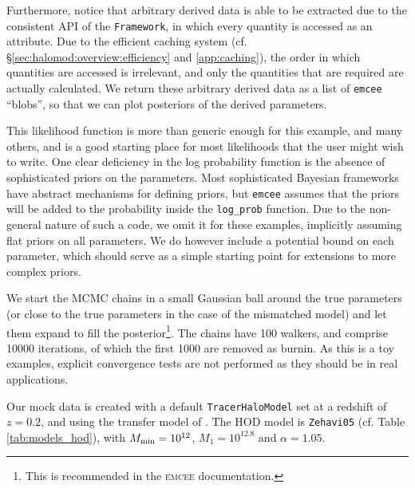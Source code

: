 \documentclass[5p,aas_macros]{elsarticle}
\newcommand{\framework}{\texttt{Framework}}
\begin{document}
Furthermore, notice that arbitrary derived data is able to be extracted due to the consistent API of the \framework, in which every quantity is accessed as an attribute. 
Due to the efficient caching system (cf. \S\ref{sec:halomod:overview:efficiency} and \ref{app:caching}), the order in which quantities are accessed is irrelevant, and only the quantities that are required are actually calculated.
We return these arbitrary derived data as a list of \verb|emcee| ``blobs'', so that we can plot posteriors of the derived parameters.

This likelihood function is more than generic enough for this example, and many others, and is a good starting place for most likelihoods that the user might wish to write.
One clear deficiency in the log probability function is the absence of sophisticated priors on the parameters. 
Most sophisticated Bayesian frameworks have abstract mechanisms for defining priors, but \verb|emcee| assumes that the priors will be added to the probability inside the \verb|log_prob| function. 
Due to the non-general nature of such a code, we omit it for these examples, implicitly assuming flat priors on all parameters. 
We do however include a potential bound on each parameter, which should serve as a simple starting point for extensions to more complex priors.

We start the MCMC chains in a small Gaussian ball around the true parameters (or close to the true parameters in the case of the mismatched model) and let them expand to fill the posterior\footnote{This is recommended in the \textsc{emcee} documentation.}. 
The chains have 100 walkers, and comprise 10000 iterations, of which the first 1000 are removed as burnin. 
As this is a toy examples, explicit convergence tests are not performed as they should be in real applications. 


Our mock data is created with a default \texttt{Tracer\-Halo\-Model} set at a redshift of $z=0.2$, and using the transfer model of \citet{Eisenstein1998}. The HOD model is \verb|Zehavi05| (cf. Table \ref{tab:models_hod}), with $M_{\rm min} = 10^{12}$, $M_1 = 10^{12.8}$ and $\alpha = 1.05$.
\end{document}
